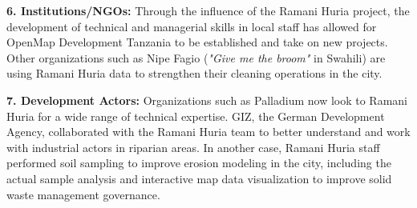 \documentclass[a4paper,12pt,twoside]{article}
\begin{document}
\begin{multicols}{2}
\textbf{6. Institutions/NGOs:} Through the influence of the Ramani Huria project, the development of technical and managerial skills in local staff has allowed for OpenMap Development Tanzania to be established and take on new projects. Other organizations such as Nipe Fagio (\textit{"Give me the broom"} in Swahili) are using Ramani Huria data to strengthen their cleaning operations in the city.

\textbf{7. Development Actors:} Organizations such as Palladium now look to Ramani Huria for a wide range of technical expertise. GIZ, the German Development Agency, collaborated with the Ramani Huria team to better understand and work with industrial actors in riparian areas. In another case, Ramani Huria staff performed soil sampling to improve erosion modeling in the city, including the actual sample analysis and interactive map data visualization to improve solid waste management governance. \end{multicols}  


\newpage
\end{document}
